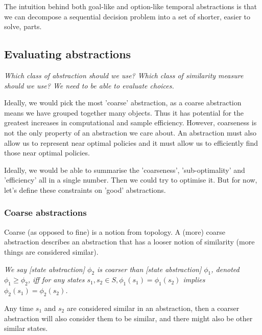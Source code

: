 The intuition behind both goal-like and option-like temporal abstractions is that
we can decompose a sequential decision problem into a set of shorter, easier to solve, parts.


\subsection{Evaluating abstractions}

\begin{displayquote}
\textsl{
Which class of abstraction should we use?
Which class of similarity measure should we use?
We need to be able to evaluate choices.}
\end{displayquote}

Ideally, we would pick the most 'coarse' abstraction, as a coarse abstraction means we have grouped together many objects.
Thus it has potential for the greatest increases in computational and sample efficiency.
However, coarseness is not the only property of an abstraction we care about.
An abstraction must also allow us to represent near optimal policies and it must allow us
to efficiently find those near optimal policies.

Ideally, we would be able to summarise the 'coarseness', 'sub-optimality' and 'efficiency' all in a single number.
Then we could try to optimise it. But for now, let's define these constraints on 'good' abstractions.

\subsubsection{Coarse abstractions}


Coarse (as opposed to fine) is a notion from topology.
A (more) coarse abstraction describes an abstraction that has a looser
notion of similarity (more things are considered similar). \footnotemark[24]


\textit{We say [state abstraction] $\phi_2$ is coarser than [state abstraction] $\phi_1$, denoted $\phi_1 \ge \phi_2$,
iff for any states $s_1, s_2 \in S, \phi_1(s_1) = \phi_1(s_2)$ implies $\phi_2(s_1) = \phi_2(s_2)$.} \cite{Littman2006}

Any time $s_1$ and $s_2$ are considered similar in an abstraction, then a coarser
abstraction will also consider them to be similar, and there might also be other similar states. \footnotemark[25]


